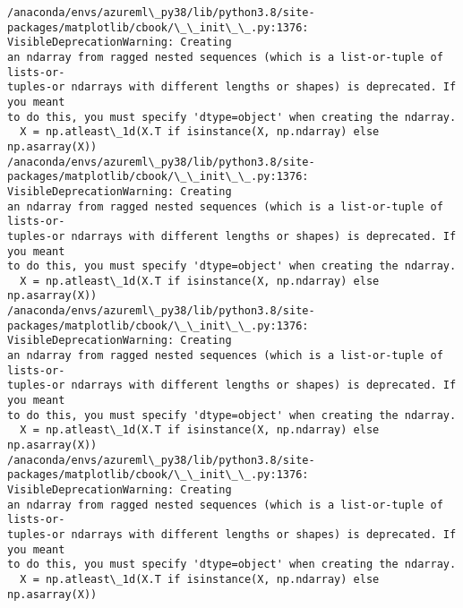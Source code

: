 \documentclass[11pt]{article}
\begin{document}
    \begin{Verbatim}[commandchars=\\\{\}]
/anaconda/envs/azureml\_py38/lib/python3.8/site-
packages/matplotlib/cbook/\_\_init\_\_.py:1376: VisibleDeprecationWarning: Creating
an ndarray from ragged nested sequences (which is a list-or-tuple of lists-or-
tuples-or ndarrays with different lengths or shapes) is deprecated. If you meant
to do this, you must specify 'dtype=object' when creating the ndarray.
  X = np.atleast\_1d(X.T if isinstance(X, np.ndarray) else np.asarray(X))
/anaconda/envs/azureml\_py38/lib/python3.8/site-
packages/matplotlib/cbook/\_\_init\_\_.py:1376: VisibleDeprecationWarning: Creating
an ndarray from ragged nested sequences (which is a list-or-tuple of lists-or-
tuples-or ndarrays with different lengths or shapes) is deprecated. If you meant
to do this, you must specify 'dtype=object' when creating the ndarray.
  X = np.atleast\_1d(X.T if isinstance(X, np.ndarray) else np.asarray(X))
/anaconda/envs/azureml\_py38/lib/python3.8/site-
packages/matplotlib/cbook/\_\_init\_\_.py:1376: VisibleDeprecationWarning: Creating
an ndarray from ragged nested sequences (which is a list-or-tuple of lists-or-
tuples-or ndarrays with different lengths or shapes) is deprecated. If you meant
to do this, you must specify 'dtype=object' when creating the ndarray.
  X = np.atleast\_1d(X.T if isinstance(X, np.ndarray) else np.asarray(X))
/anaconda/envs/azureml\_py38/lib/python3.8/site-
packages/matplotlib/cbook/\_\_init\_\_.py:1376: VisibleDeprecationWarning: Creating
an ndarray from ragged nested sequences (which is a list-or-tuple of lists-or-
tuples-or ndarrays with different lengths or shapes) is deprecated. If you meant
to do this, you must specify 'dtype=object' when creating the ndarray.
  X = np.atleast\_1d(X.T if isinstance(X, np.ndarray) else np.asarray(X))
    \end{Verbatim}

    \begin{center}
    \end{center}
    { \hspace*{\fill} \\}
    
    \begin{center}
    \end{center}
    { \hspace*{\fill} \\}
    
\end{document}
